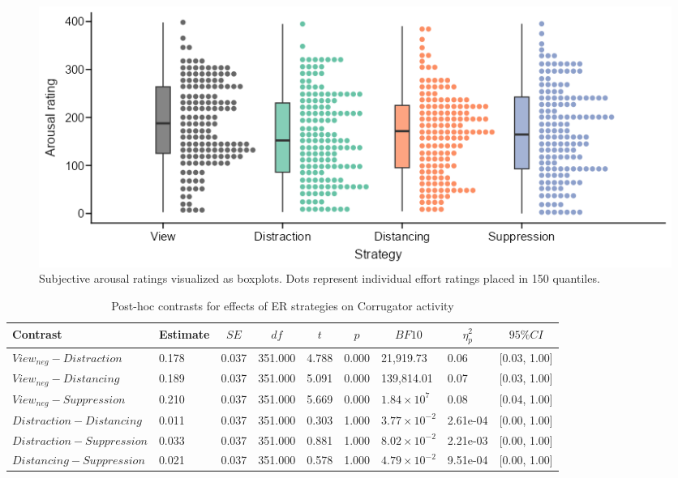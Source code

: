\documentclass[
  man,floatsintext]{apa6}
\begin{document}
\begin{figure}[H]
\includegraphics[width=\textwidth]{figures/FigSubjArousalReg} \caption{Subjective arousal ratings visualized as boxplots. Dots represent individual effort ratings placed in 150 quantiles.}\label{fig:SupplFigArousalReg}
\end{figure}

\begin{table}[H]

\begin{center}
\begin{threeparttable}

\caption{\label{tab:SupplEffectCorrReg}Post-hoc contrasts for effects of ER strategies on Corrugator activity}

\footnotesize{

\begin{tabular}{lllllllll}
\toprule
Contrast & \multicolumn{1}{c}{Estimate} & \multicolumn{1}{c}{$SE$} & \multicolumn{1}{c}{$df$} & \multicolumn{1}{c}{$t$} & \multicolumn{1}{c}{$p$} & \multicolumn{1}{c}{$BF10$} & \multicolumn{1}{c}{$\eta_{p}^{2}$} & \multicolumn{1}{c}{$95\% CI$}\\
\midrule
$View_{neg} - Distraction$ & 0.178 & 0.037 & 351.000 & 4.788 & 0.000 & 21,919.73 & 0.06 & {}[0.03, 1.00]\\
$View_{neg} - Distancing$ & 0.189 & 0.037 & 351.000 & 5.091 & 0.000 & 139,814.01 & 0.07 & {}[0.03, 1.00]\\
$View_{neg} - Suppression$ & 0.210 & 0.037 & 351.000 & 5.669 & 0.000 & $1.84 \times 10^{7}$ & 0.08 & {}[0.04, 1.00]\\
$Distraction - Distancing$ & 0.011 & 0.037 & 351.000 & 0.303 & 1.000 & $3.77 \times 10^{-2}$ & 2.61e-04 & {}[0.00, 1.00]\\
$Distraction - Suppression$ & 0.033 & 0.037 & 351.000 & 0.881 & 1.000 & $8.02 \times 10^{-2}$ & 2.21e-03 & {}[0.00, 1.00]\\
$Distancing - Suppression$ & 0.021 & 0.037 & 351.000 & 0.578 & 1.000 & $4.79 \times 10^{-2}$ & 9.51e-04 & {}[0.00, 1.00]\\
\bottomrule
\end{tabular}

}

\end{threeparttable}
\end{center}

\end{table}
\end{document}
